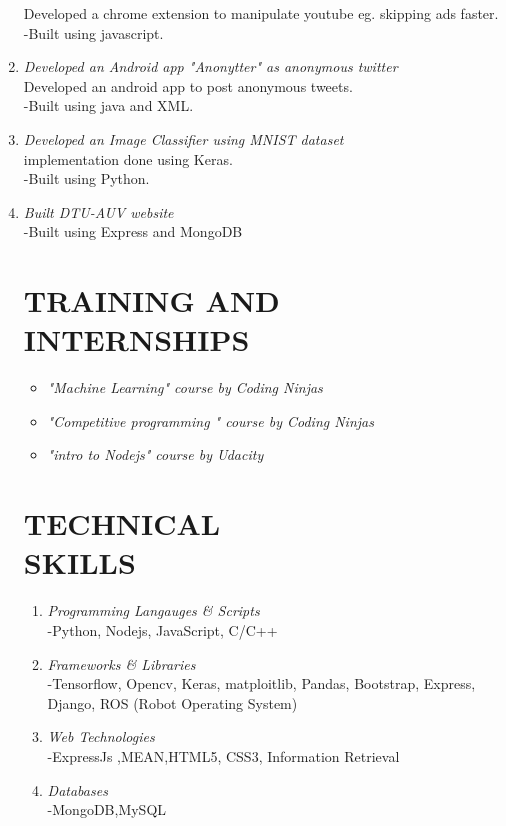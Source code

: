 \documentclass[margin]{res}
\begin{document}
\begin{enumerate}
 Developed a chrome extension to manipulate youtube eg. skipping ads faster.\\
  	-Built using javascript.\\
\item {\large{\sl Developed an Android app "Anonytter" as anonymous twitter}}\\
 Developed an android app to post anonymous tweets.\\
  	-Built using java and XML.\\
\item {\large{\sl Developed an Image Classifier using MNIST dataset}}\\
 implementation done using Keras.\\
  	-Built using Python.\\
\item {\large{\sl Built DTU-AUV website}}\\
 
  	-Built using Express and MongoDB\\

\section{TRAINING AND INTERNSHIPS} \begin{itemize}
 
 \item{\sl  "Machine Learning" course by Coding Ninjas }
 \item{\sl  "Competitive programming " course by Coding Ninjas}
 \item{\sl  "intro to Nodejs" course by Udacity}
 \end{itemize}

\section{TECHNICAL  \\ SKILLS} \begin{enumerate}
\item {\sl Programming Langauges \& Scripts }\\
	-Python, Nodejs, JavaScript, C/C++
\item {\sl Frameworks \& Libraries}\\
	-Tensorflow, Opencv, Keras, matploitlib, Pandas, Bootstrap, Express, Django, ROS (Robot Operating System)
\item {\sl Web Technologies}\\
	-ExpressJs ,MEAN,HTML5, CSS3, Information Retrieval 
\item{\sl Databases}\\
	-MongoDB,MySQL
\end{enumerate}




	\end{enumerate}
\end{document}
